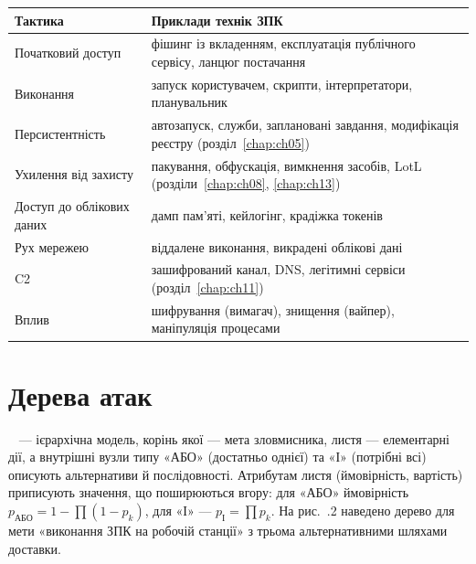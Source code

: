 
\begin{center}\footnotesize
\begin{tabularx}{\linewidth}{L{26mm} Y}
\toprule
Тактика & Приклади технік ЗПК \\
\midrule
Початковий доступ & фішинг із вкладенням, експлуатація публічного сервісу, ланцюг постачання \\
Виконання & запуск користувачем, скрипти, інтерпретатори, планувальник \\
Персистентність & автозапуск, служби, заплановані завдання, модифікація реєстру (розділ~\ref{chap:ch05}) \\
Ухилення від захисту & пакування, обфускація, вимкнення засобів, LotL (розділи~\ref{chap:ch08}, \ref{chap:ch13}) \\
Доступ до облікових даних & дамп пам'яті, кейлогінг, крадіжка токенів \\
Рух мережею & віддалене виконання, викрадені облікові дані \\
C2 & зашифрований канал, DNS, легітимні сервіси (розділ~\ref{chap:ch11}) \\
Вплив & шифрування (вимагач), знищення (вайпер), маніпуляція процесами \\
\bottomrule
\end{tabularx}
\end{center}

\section{Дерева атак}\label{sec:ch04-trees}

~\cite{ch04:schneier,ch04:kordy} --- ієрархічна модель, корінь якої --- мета зловмисника, листя --- елементарні дії, а внутрішні вузли типу «АБО» (достатньо однієї) та «І» (потрібні всі) описують альтернативи й послідовності. Атрибутам листя (ймовірність, вартість) приписують значення, що поширюються вгору: для «АБО» ймовірність $p_{\text{АБО}} = 1-\prod(1-p_k)$, для «І» --- $p_{\text{І}} = \prod p_k$. На рис.~\thechapter.2 наведено дерево для мети «виконання ЗПК на робочій станції» з трьома альтернативними шляхами доставки.

